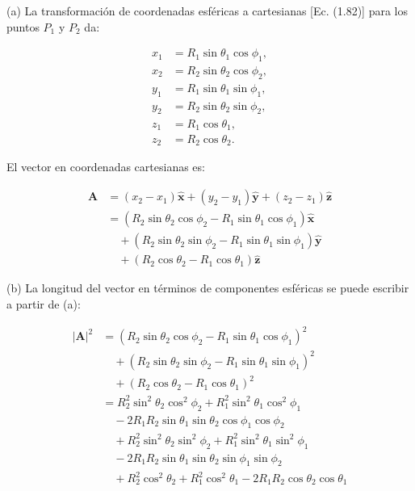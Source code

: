 \documentclass{book}
\begin{document}
(a) La transformación de coordenadas esféricas a cartesianas [Ec. (1.82)] para los puntos $P_1$ y $P_2$ da:

\begin{align*}
x_1 &= R_1 \sin \theta_1 \cos \phi_1, \\
x_2 &= R_2 \sin \theta_2 \cos \phi_2, \\
y_1 &= R_1 \sin \theta_1 \sin \phi_1, \\
y_2 &= R_2 \sin \theta_2 \sin \phi_2, \\
z_1 &= R_1 \cos \theta_1, \\
z_2 &= R_2 \cos \theta_2.
\end{align*}

El vector en coordenadas cartesianas es:

\begin{align*}
\mathbf{A} &= (x_2 - x_1) \mathbf{\hat{x}} + (y_2 - y_1) \mathbf{\hat{y}} + (z_2 - z_1) \mathbf{\hat{z}} \\
&= (R_2 \sin \theta_2 \cos \phi_2 - R_1 \sin \theta_1 \cos \phi_1) \mathbf{\hat{x}} \\
&\quad + (R_2 \sin \theta_2 \sin \phi_2 - R_1 \sin \theta_1 \sin \phi_1) \mathbf{\hat{y}} \\
&\quad + (R_2 \cos \theta_2 - R_1 \cos \theta_1) \mathbf{\hat{z}}
\end{align*}

(b) La longitud del vector en términos de componentes esféricas se puede escribir a partir de (a):

\begin{align*}
|\mathbf{A}|^2 &= (R_2 \sin \theta_2 \cos \phi_2 - R_1 \sin \theta_1 \cos \phi_1)^2 \\
&\quad + (R_2 \sin \theta_2 \sin \phi_2 - R_1 \sin \theta_1 \sin \phi_1)^2 \\
&\quad + (R_2 \cos \theta_2 - R_1 \cos \theta_1)^2 \\
&= R_2^2 \sin^2 \theta_2 \cos^2 \phi_2 + R_1^2 \sin^2 \theta_1 \cos^2 \phi_1 \\
&\quad - 2 R_1 R_2 \sin \theta_1 \sin \theta_2 \cos \phi_1 \cos \phi_2 \\
&\quad + R_2^2 \sin^2 \theta_2 \sin^2 \phi_2 + R_1^2 \sin^2 \theta_1 \sin^2 \phi_1 \\
&\quad - 2 R_1 R_2 \sin \theta_1 \sin \theta_2 \sin \phi_1 \sin \phi_2 \\
&\quad + R_2^2 \cos^2 \theta_2 + R_1^2 \cos^2 \theta_1 - 2 R_1 R_2 \cos \theta_2 \cos \theta_1
\end{align*}
\end{document}
